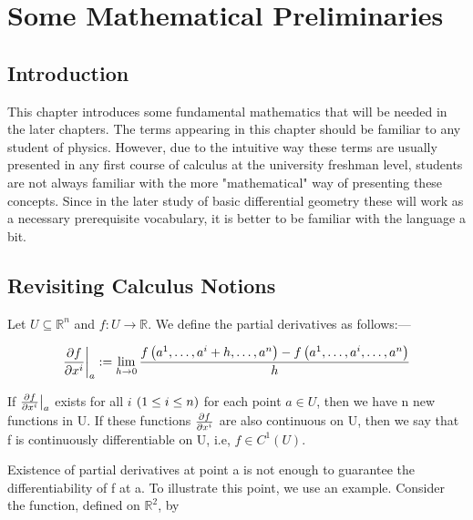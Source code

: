 
\chapter{Some Mathematical Preliminaries}
\label{ch:foundations}

\section{Introduction}

This chapter introduces some fundamental mathematics that will be needed in the later chapters. The terms appearing in this chapter should be familiar to any student of physics. However, due to the intuitive way these terms are usually presented in any first course of calculus at the university freshman level, students are not always familiar with the more "mathematical" way of presenting these concepts. Since in the later study of basic differential geometry these will work as a necessary prerequisite vocabulary, it is better to be familiar with the language a bit. 









\section{Revisiting Calculus Notions}

Let $ U \subseteq \mathbb{R}^n$ and $ f: U \longrightarrow \mathbb{R}$. We define the partial derivatives as follows:—

\begin{align*}
    & \frac{\partial f}{\partial x^i} \bigg|_a := \displaystyle\lim_{h \to 0} \frac{ f \left(  a^1, \ldots, a^i + h, \ldots, a^n \right) - f \left(  a^1, \ldots, a^i, \ldots, a^n \right)}{h} \\
\end{align*}

If $ \frac{\partial f}{\partial x^i} \big|_a$ exists for all $ i$ $ \left(  1 \leq i \leq n \right)$ for each point $ a \in U$, then we have n new functions in U. If these functions $ \frac{\partial f}{\partial x^i}$ are also continuous on U, then we say that f is continuously differentiable on U, i.e, $ f \in C^1(U)$.

Existence of partial derivatives at point a is not enough to guarantee the differentiability of f at a. To illustrate this point, we use an example. Consider the function, defined on $ \mathbb{R}^2$, by

